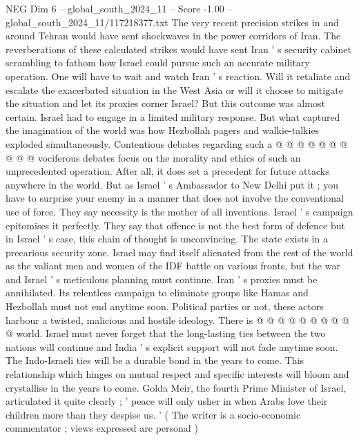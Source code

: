 \begin{textsample}{NEG Dim 6 – global\_south\_2024\_11 – Score -1.00 – global\_south\_2024\_11/117218377.txt}
The very recent precision strikes in and around Tehran would have sent shockwaves in the power corridors of Iran.
The reverberations of these calculated strikes would have sent Iran ' s security cabinet scrambling to fathom how Israel could pursue such an accurate military operation.
One will have to wait and watch Iran ' s reaction.
Will it retaliate and escalate the exacerbated situation in the West Asia or will it choose to mitigate the situation and let its proxies corner Israel?
But this outcome was almost certain.
Israel had to engage in a limited military response.
But what captured the imagination of the world was how Hezbollah pagers and walkie-talkies exploded simultaneously.
Contentious debates regarding such a @ @ @ @ @ @ @ @ @ @ vociferous debates focus on the morality and ethics of such an unprecedented operation.
After all, it does set a precedent for future attacks anywhere in the world.
But as Israel ' s Ambassador to New Delhi put it ; you have to surprise your enemy in a manner that does not involve the conventional use of force.
They say necessity is the mother of all inventions.
Israel ' s campaign epitomises it perfectly.
They say that offence is not the best form of defence but in Israel ' s case, this chain of thought is unconvincing.
The state exists in a precarious security zone.
Israel may find itself alienated from the rest of the world as the valiant men and women of the IDF battle on various fronts, but the war and Israel ' s meticulous planning must continue.
Iran ' s proxies must be annihilated.
Its relentless campaign to eliminate groups like Hamas and Hezbollah must not end anytime soon.
Political parties or not, these actors harbour a twisted, malicious and hostile ideology.
There is @ @ @ @ @ @ @ @ @ @ world.
Israel must never forget that the long-lasting ties between the two nations will continue and India ' s explicit support will not fade anytime soon.
The Indo-Israeli ties will be a durable bond in the years to come.
This relationship which hinges on mutual respect and specific interests will bloom and crystallise in the years to come.
Golda Meir, the fourth Prime Minister of Israel, articulated it quite clearly ; ' peace will only usher in when Arabs love their children more than they despise us. ' ( The writer is a socio-economic commentator ; views expressed are personal )

\end{textsample}
